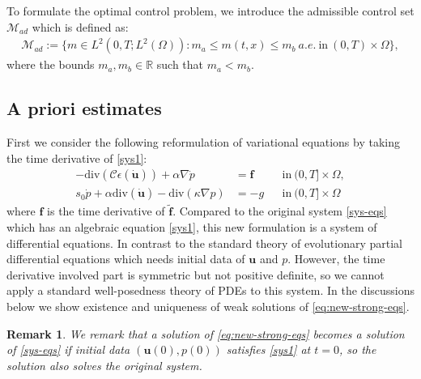 \documentclass{amsart}
\newtheorem{remark}{Remark}[section]
\begin{document}
To formulate the optimal control problem, we introduce the admissible control set $\mathcal{M}_{ad}$ which is defined as:
\begin{align}\label{admcontrol}
	\mathcal{M}_{ad}:= \{m \in L^{2}(0,T;L^{2}(\Omega)): m_{a}\le m(t,x) \le m_b \ a.e. \ \text{in} \ (0,T) \times \Omega\},
\end{align}
where the bounds $m_{a}, m_{b} \in \mathbb{R}$ such that $m_{a} < m_{b}$.
\subsection{A priori estimates}\label{A priori estimates}
First we consider the following reformulation of variational equations by taking the time derivative of \eqref{sys1}:
%
\begin{subequations}
	\label{eq:new-strong-eqs}
\begin{align}
	\label{eq:new-strong-eq1} - \text{div} (\boldsymbol{\mathcal{C}} \epsilon(\dot{\boldsymbol{u}})) + \alpha \nabla \dot{p} &= {\boldsymbol{f}} && \text{in} \ (0,T] \times \Omega,\\
	\label{eq:new-strong-eq2} s_{0} \dot{p} + \alpha \text{div}(\dot{\boldsymbol{u}}) -  \text{div} (\kappa \nabla p) &= -g && \text{in} \ (0,T] \times \Omega 
\end{align}
\end{subequations}
%
where $\boldsymbol{f}$ is the time derivative of $\tilde{\boldsymbol{f}}$. 
Compared to the original system \eqref{sys-eqs} which has an algebraic equation \eqref{sys1}, this new formulation is a system of differential equations. In contrast to the standard theory of evolutionary partial differential equations which needs initial data of $\boldsymbol{u}$ and $p$. However, the time derivative involved part is symmetric but not positive definite, so we cannot apply a standard well-posedness theory of PDEs to this system. In the discussions below we show existence and uniqueness of weak solutions of \eqref{eq:new-strong-eqs}. 
\begin{remark}
    We remark that a solution of \eqref{eq:new-strong-eqs} becomes a solution of \eqref{sys-eqs} if initial data $(\boldsymbol{u}(0), p(0))$ satisfies \eqref{sys1} at $t=0$, so the solution also solves the original system.   
\end{remark}
\end{document}
